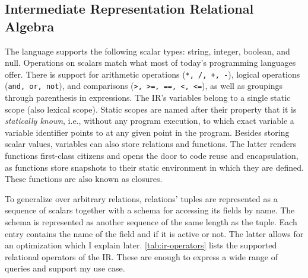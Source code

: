\subsection{Intermediate Representation Relational Algebra}\label{sec:ir}

The language supports the following scalar types: string, integer, boolean, and null.
Operations on scalars match what most of today's programming languages offer.
There is support for arithmetic operations (\texttt{*, /, +, -}),
logical operations (\texttt{and, or, not}),
and comparisons (\texttt{>, >=, ==, <, <=}),
as well as groupings through parenthesis in expressions.
The \ac{IR}'s variables belong to a single static scope (also lexical scope).
Static scopes are named after their property that it is \emph{statically known},
i.e., without any program execution, to which exact variable a
variable identifier points to at any given point in the program.
Besides storing scalar values, variables can also store relations and functions.
The latter renders functions first-class citizens and opens the door to
code reuse and encapsulation, as functions store snapshots to their static
environment in which they are defined.
These functions are also known as closures.

To generalize over arbitrary relations, relations' tuples are represented as
a sequence of scalars together with a schema for accessing its fields by name.
The schema is represented as another sequence of the same length as the tuple.
Each entry contains the name of the field and if it is active or not.
The latter allows for an optimization which I explain later.
\ref{tab:ir-operators} lists the supported relational operators of the \ac{IR}.
These are enough to express a wide range of queries and support my use case.

